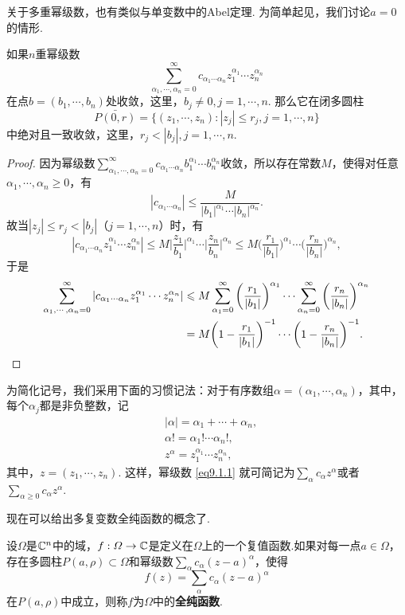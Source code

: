 关于多重幂级数，也有类似与单变数中的Abel定理. 为简单起见，我们讨论$a=0$的情形.
\begin{prop}\label{prop9.1.1}
  如果$n$重幂级数
  \begin{equation}\label{eq9.1.1}
    \sum_{\alpha_1,\cdots,\alpha_n=0}^\infty c_{\alpha_1\cdots\alpha_n}z_1^{\alpha_1}
    \cdots z_n^{\alpha_n}
  \end{equation}
  在点$b=(b_1,\cdots,b_n)$处收敛，这里，$b_j\ne0,j=1,\cdots,n$. 那么它在闭多圆柱
  \[
    \bar{P(0,r)} = \{(z_1,\cdots,z_n):|z_j|\le r_j,j=1,\cdots,n\}
  \]
  中绝对且一致收敛，这里，$r_j<|b_j|,j=1,\cdots,n$.
\end{prop}
\begin{proof}
  因为幂级数$\sum_{\alpha_1,\cdots,\alpha_n=0}^\infty c_{\alpha_1\cdots\alpha_n}b_1^{\alpha_1}
  \cdots b_n^{\alpha_n}$收敛，所以存在常数$M$，使得对任意$\alpha_1,\cdots,\alpha_n\ge0$，有
  \[
    |c_{\alpha_1\cdots\alpha_n}| \le \frac M{|b_1|^{\alpha_1}\cdots|b_n|^{\alpha_n}}.
  \]
  故当$|z_j|\le r_j<|b_j|$（$j=1,\cdots,n$）时，有
  \[
    |c_{\alpha_1\cdots\alpha_n}z_1^{\alpha_1}
    \cdots z_n^{\alpha_n}|\le M\bigg|\frac{z_1}{b_1}\bigg|^{\alpha_1}\cdots
    \bigg|\frac{z_n}{b_n}\bigg|^{\alpha_n}
    \le M\bigg(\frac{r_1}{|b_1|}\bigg)^{\alpha_1}\cdots
    \bigg(\frac{r_n}{|b_n|}\bigg)^{\alpha_n},
  \]
  于是
  \begin{align*}
    \sum_{\alpha_1,\cdots,\alpha_n=0}^\infty |c_{\alpha_1\cdots\alpha_n}z_1^{\alpha_1}
    \cdots z_n^{\alpha_n}|&\le M\sum_{\alpha_1=0}^\infty \bigg(\frac{r_1}{|b_1|}\bigg)^{\alpha_1}\cdots\sum_{\alpha_n=0}^\infty
    \bigg(\frac{r_n}{|b_n|}\bigg)^{\alpha_n}\\
    & = M\bigg(1-\frac{r_1}{|b_1|}\bigg)^{-1} \cdots\bigg(1-\frac{r_n}{|b_n|}\bigg)^{-1}. \qedhere
  \end{align*}
\end{proof}

为简化记号，我们采用下面的习惯记法：对于有序数组$\alpha=(\alpha_1,\cdots,\alpha_n)$，其中，每个$\alpha_j$都是非负整数，记
\begin{align*}
  & |\alpha| = \alpha_1 + \cdots + \alpha_n,\\
  & \alpha! = \alpha_1! \cdots \alpha_n!,\\
  & z^\alpha = z_1^{\alpha_1}\cdots z_n^{\alpha_n},
\end{align*}
其中，$z=(z_1,\cdots,z_n)$. 这样，幂级数 \eqref{eq9.1.1} 就可简记为$\sum_\alpha c_\alpha z^\alpha$或者$\sum_{\alpha\ge0}c_\alpha z^\alpha$.

现在可以给出多复变数全纯函数的概念了.
\begin{definition}\label{def9.1.2}
  设$\Omega$是$\MC^n$中的域，$f:\Omega\to \MC$是定义在$\Omega$上的一个复值函数.如果对每一点$a\in\Omega$，存在多圆柱$P(a,\rho)\subset\Omega$和幂级数$\sum_\alpha c_\alpha(z-a)^\alpha$，使得
  \begin{equation}\label{eq9.1.2}
    f(z) = \sum_\alpha c_\alpha(z-a)^\alpha
  \end{equation}
  在$P(a,\rho)$中成立，则称$f$为$\Omega$中的\textbf{全纯函数}.
\end{definition}

